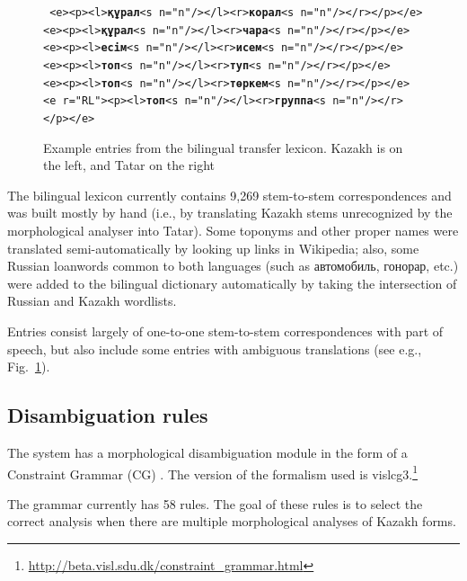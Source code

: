 \documentclass[11pt]{article}
\begin{document}
\begin{figure}[htbp]
\hspace{3cm}\parbox[t]{0.7\textwidth}{{\tt
    <e><p><l>\textbf{құрал}<s n="n"/></l><r>\textbf{корал}<s n="n"/></r></p></e> \\
    <e><p><l>\textbf{құрал}<s n="n"/></l><r>\textbf{чара}<s n="n"/></r></p></e> \\
    <e><p><l>\textbf{есім}<s n="n"/></l><r>\textbf{исем}<s n="n"/></r></p></e> \\
    <e><p><l>\textbf{топ}<s n="n"/></l><r>\textbf{туп}<s n="n"/></r></p></e> \\
    <e><p><l>\textbf{топ}<s n="n"/></l><r>\textbf{төркем}<s n="n"/></r></p></e> \\
    <e r="RL"><p><l>\textbf{топ}<s n="n"/></l><r>\textbf{группа}<s n="n"/></r></p></e>
}}%
\caption{Example entries from the bilingual transfer lexicon. Kazakh is on the left, and Tatar on the right}
\label{fig:bidix}
\end{figure}

The bilingual lexicon currently contains 9,269 stem-to-stem correspondences and was built mostly by hand (i.e., by translating Kazakh stems unrecognized by the morphological analyser into Tatar).  Some toponyms and other proper names were translated semi-automatically by looking up links in Wikipedia; also, some Russian loanwords common to both languages (such as автомобиль, гонорар, etc.) were added to the bilingual dictionary automatically by taking the intersection of Russian and Kazakh wordlists.

Entries consist largely of one-to-one stem-to-stem correspondences with part of speech, but also include some entries with ambiguous translations (see e.g., Fig.~\ref{fig:bidix}).

\subsection{Disambiguation rules}

The system has a morphological disambiguation module in the form of a 
Constraint Grammar (CG) \citep{karlsson95}. The version of the formalism used is vislcg3.\footnote{\url{http://beta.visl.sdu.dk/constraint_grammar.html}}

The grammar currently has 58 rules.  The goal of these rules is to select the correct analysis when there are multiple morphological analyses of Kazakh forms.
\end{document}
